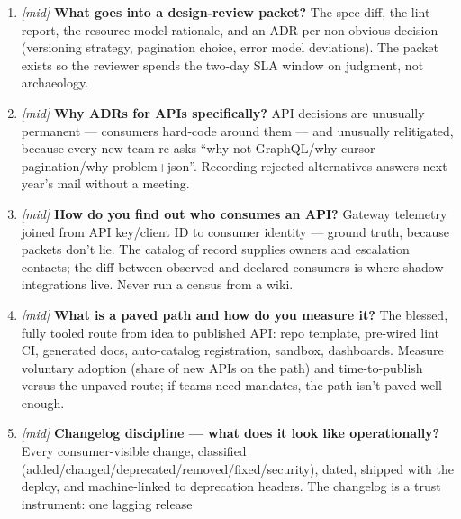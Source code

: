\begin{enumerate}[label=\textbf{Q\arabic*.}, leftmargin=1.7cm]
{        weak first-call conversion. Diagnosis path?} The failure is
        between ``has credential'' and ``made a call'': quickstart
        quality, missing base-URL clarity, confusing scopes, or no
        sandbox. Instrument docs-viewed events and quickstart completion,
        time five developers through the getting-started flow, and check
        the \textsf{first call}$\rightarrow$\textsf{first 200} step too
        --- if 401s dominate first calls, the auth docs are the real
        culprit.
  \item \emph{[mid]} \textbf{What goes into a design-review packet?} The
        spec diff, the lint report, the resource model rationale, and an
        ADR per non-obvious decision (versioning strategy, pagination
        choice, error model deviations). The packet exists so the
        reviewer spends the two-day SLA window on judgment, not
        archaeology.
  \item \emph{[mid]} \textbf{Why ADRs for APIs specifically?} API
        decisions are unusually permanent --- consumers hard-code around
        them --- and unusually relitigated, because every new team
        re-asks ``why not GraphQL/why cursor pagination/why problem+json''.
        Recording rejected alternatives answers next year's mail without
        a meeting.
  \item \emph{[mid]} \textbf{How do you find out who consumes an API?}
        Gateway telemetry joined from API key/client ID to consumer
        identity --- ground truth, because packets don't lie. The catalog
        of record supplies owners and escalation contacts; the diff
        between observed and declared consumers is where shadow
        integrations live. Never run a census from a wiki.
  \item \emph{[mid]} \textbf{What is a paved path and how do you measure
        it?} The blessed, fully tooled route from idea to published API:
        repo template, pre-wired lint CI, generated docs, auto-catalog
        registration, sandbox, dashboards. Measure voluntary adoption
        (share of new APIs on the path) and time-to-publish versus the
        unpaved route; if teams need mandates, the path isn't paved well
        enough.
  \item \emph{[mid]} \textbf{Changelog discipline --- what does it look
        like operationally?} Every consumer-visible change, classified
        (added/changed/deprecated/removed/fixed/security), dated,
        shipped with the deploy, and machine-linked to deprecation
        headers. The changelog is a trust instrument: one lagging release

\end{enumerate}
